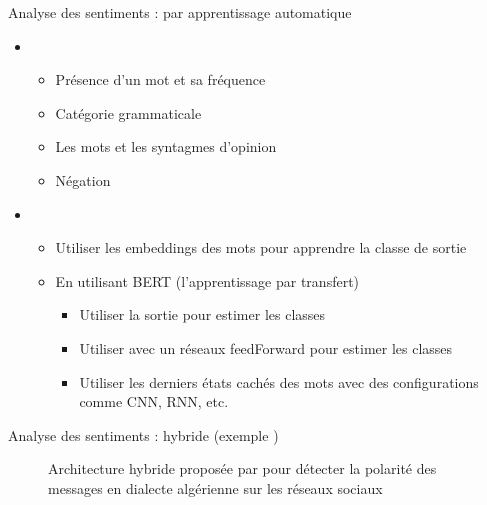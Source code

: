 \documentclass{KodeBook}
\begin{document}
Analyse des sentiments : par apprentissage automatique
\begin{itemize}
	\item {}
	\begin{itemize}
		\item Présence d'un mot et sa fréquence 
		\item Catégorie grammaticale
		\item Les mots et les syntagmes d'opinion
		\item Négation
	\end{itemize}
	\item {}
	\begin{itemize}
		\item Utiliser les embeddings des mots pour apprendre la classe de sortie
		\item En utilisant BERT (l'apprentissage par transfert)
		\begin{itemize}
			\item Utiliser la sortie \keyword{[CLS]} pour estimer les classes
			\item Utiliser \keyword{[CLS]} avec un réseaux feedForward pour estimer les classes
			\item Utiliser les derniers états cachés des mots avec des configurations comme CNN, RNN, etc.
		\end{itemize}
	\end{itemize}
\end{itemize}

Analyse des sentiments : hybride (exemple \cite{18-bettiche-al}) 
\begin{figure}
	\centering
	\caption{Architecture hybride proposée par \cite{18-bettiche-al} pour détecter la polarité des messages en dialecte algérienne sur les réseaux sociaux}
\end{figure}
\end{document}
